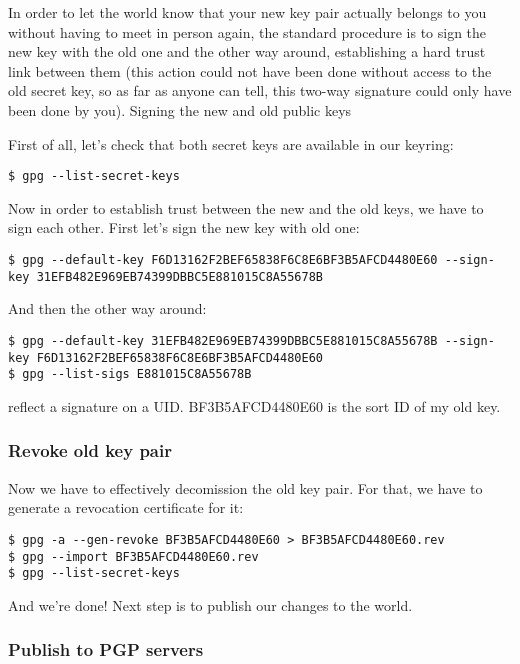 In order to let the world know that your new key pair actually belongs to you without having to meet in person again, the standard procedure is to sign the new key with the old one and the other way around, establishing a hard trust link between them (this action could not have been done without access to the old secret key, so as far as anyone can tell, this two-way signature could only have been done by you).
Signing the new and old public keys

First of all, let’s check that both secret keys are available in our keyring:

\begin{verbatim}
$ gpg --list-secret-keys
\end{verbatim}

Now in order to establish trust between the new and the old keys, we have to sign each other. First let’s sign the new key with old one:

\begin{verbatim}
$ gpg --default-key F6D13162F2BEF65838F6C8E6BF3B5AFCD4480E60 --sign-key 31EFB482E969EB74399DBBC5E881015C8A55678B
\end{verbatim}

And then the other way around:

\begin{verbatim}
$ gpg --default-key 31EFB482E969EB74399DBBC5E881015C8A55678B --sign-key F6D13162F2BEF65838F6C8E6BF3B5AFCD4480E60
$ gpg --list-sigs E881015C8A55678B
\end{verbatim}

reflect a signature on a UID. BF3B5AFCD4480E60 is the sort ID of my old key.

\subsubsection{Revoke old key pair}

Now we have to effectively decomission the old key pair. For that, we have to generate a revocation certificate for it:

\begin{verbatim}
$ gpg -a --gen-revoke BF3B5AFCD4480E60 > BF3B5AFCD4480E60.rev
$ gpg --import BF3B5AFCD4480E60.rev
$ gpg --list-secret-keys
\end{verbatim}

And we’re done! Next step is to publish our changes to the world.

\subsubsection{Publish to PGP servers}

